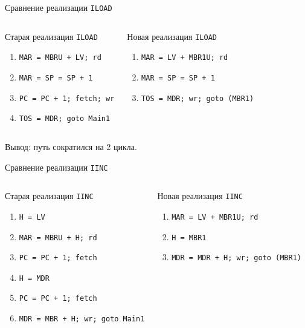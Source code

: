 \begin{frame}{Сравнение реализации \texttt{ILOAD}}
\small
\begin{columns}
    \column{5.5cm}
    \begin{block}{Старая реализация \texttt{ILOAD}}
    \begin{enumerate}
        \item \texttt{MAR = MBRU + LV; rd}
        \item \texttt{MAR = SP = SP + 1}
        \item \texttt{PC = PC + 1; fetch; wr}
        \item \texttt{TOS = MDR; goto~Main1}
    \end{enumerate}
    \end{block}

    \pause
    \column{6cm}
    \begin{block}{Новая реализация \texttt{ILOAD}}
    \begin{enumerate}
        \item \texttt{MAR = LV + MBR1U; rd}
        \item \texttt{MAR = SP = SP + 1}
        \item \texttt{TOS = MDR; wr; goto~(MBR1)}
    \end{enumerate}
    \end{block}
\end{columns}

\vspace{1cm}
Вывод: путь сократился на 2 цикла.
\end{frame}

\begin{frame}{Сравнение реализации \texttt{IINC}}
\begin{columns}
    \column{5.5cm}
    \begin{block}{Старая реализация \texttt{IINC}}
    \pause
    \begin{enumerate}
        \item \texttt{H = LV}
        \item \texttt{MAR = MBRU + H; rd}
        \item \texttt{PC = PC + 1; fetch}
        \item \texttt{H = MDR}
        \item \texttt{PC = PC + 1; fetch}
        \item \texttt{MDR = MBR + H; wr; goto Main1}
    \end{enumerate}
    \end{block}

    \pause
    \column{6cm}
    \begin{block}{Новая реализация \texttt{IINC}}
    \begin{enumerate}
        \item \texttt{MAR = LV + MBR1U; rd}
        \item \texttt{H = MBR1}
        \item \texttt{MDR = MDR + H; wr; goto (MBR1)}
    \end{enumerate}
    \end{block}
\end{columns}
\end{frame}

